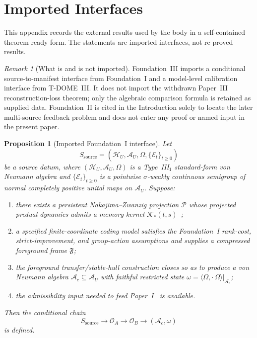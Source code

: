 \documentclass[12pt]{article}
\newtheorem{proposition}[theorem]{Proposition}
\theoremstyle{definition}
\theoremstyle{remark}
\newtheorem{remark}[theorem]{Remark}
\begin{document}
\appendix
\section{Imported Interfaces}\label{app:interfaces}

This appendix records the external results used by the body in a
self-contained theorem-ready form. The statements are imported
interfaces, not re-proved results.

\begin{remark}[What is and is not imported]
Foundation~III imports a conditional source-to-manifest interface from
Foundation~I and a model-level calibration interface from T-DOME~III.
It does not import the withdrawn Paper~III reconstruction-loss theorem;
only the algebraic comparison formula is retained as supplied data.
Foundation~II is cited in the Introduction solely to locate the later
multi-source feedback problem and does not enter any proof or named
input in the present paper.
\end{remark}

\begin{proposition}[Imported Foundation~I interface]\label{prop:A1}
Let
\[
S_{\mathrm{source}}
=
(\mathcal H_U,\mathcal A_U,\Omega,\{\mathcal E_t\}_{t\ge0})
\]
be a source datum, where
\((\mathcal H_U,\mathcal A_U,\Omega)\) is a Type~III\(_1\) standard-form
von Neumann algebra and
\(\{\mathcal E_t\}_{t\ge0}\) is a pointwise \(\sigma\)-weakly
continuous semigroup of normal completely positive unital maps on
\(\mathcal A_U\). Suppose:
\begin{enumerate}
\item there exists a persistent Nakajima--Zwanzig projection
  \(\mathcal P\) whose projected predual dynamics admits a memory kernel
  \(\mathcal K_*(t,s)\)~\cite{Nakajima1958,Zwanzig1960,BreuerPetruccione2002};
\item a specified finite-coordinate coding model satisfies the
  Foundation~I rank-cost, strict-improvement, and group-action
  assumptions and supplies a compressed foreground frame \(\mathfrak F\);
\item the foreground transfer/stable-hull construction closes so as to
  produce a von Neumann algebra \(\mathcal A_c\subseteq\mathcal A_U\)
  with faithful restricted state
  \(\omega=\langle\Omega,\cdot\,\Omega\rangle|_{\mathcal A_c}\);
\item the admissibility input needed to feed Paper~I~\cite{PaperI} is
  available.
\end{enumerate}
Then the conditional chain
\[
S_{\mathrm{source}}
\to
\mathcal O_A
\to
\mathcal O_B
\to
(\mathcal A_c,\omega)
\]
is defined.
\end{proposition}
\end{document}
